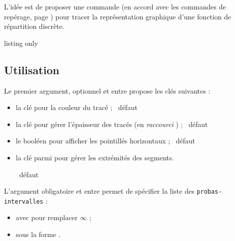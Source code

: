 \begin{tipblock}
 L'idée est de proposer une commande (en accord avec les commandes de repérage, page \pageref{reperagetikz}) pour tracer la représentation graphique d'une fonction de répartition discrète.
\end{tipblock}

\begin{PresCodeTexPL}{listing only}
\end{PresCodeTexPL}

\subsection{Utilisation}

\begin{cautionblock}
Le premier argument, optionnel et entre \ctex{[...]} propose les clés suivantes :

\begin{itemize}
	\item la clé  pour la couleur du tracé ; \hfill~défaut 
	\item la clé  pour gérer l'épaisseur des tracés (en \textit{raccourci} \TikZ)  ; \hfill~défaut 
	\item le booléen  pour afficher les pointillés horizontaux  ; \hfill~défaut 
	\item la clé  parmi  pour gérer les extrémités des segments.
	
	\hfill~défaut 
\end{itemize}

L'argument obligatoire et entre  permet de spécifier la liste des \texttt{probas-intervalles} :

\begin{itemize}
	\item avec \ctex{*} pour remplacer $\infty$ ;
	\item sous la forme .
\end{itemize}
\vspace*{-\baselineskip}\leavevmode
\end{cautionblock}

